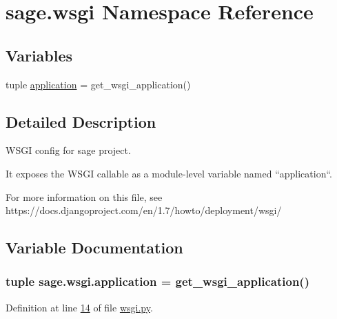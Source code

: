 \hypertarget{namespacesage_1_1wsgi}{}\section{sage.\+wsgi Namespace Reference}
\label{namespacesage_1_1wsgi}
\subsection*{Variables}
\begin{DoxyCompactItemize}
\item 
tuple \hyperlink{namespacesage_1_1wsgi_a1ddb23bace7377dbda42c61a804bb9aa}{application} = get\+\_\+wsgi\+\_\+application()
\end{DoxyCompactItemize}


\subsection{Detailed Description}
\begin{DoxyVerb}WSGI config for sage project.

It exposes the WSGI callable as a module-level variable named ``application``.

For more information on this file, see
https://docs.djangoproject.com/en/1.7/howto/deployment/wsgi/
\end{DoxyVerb}
 

\subsection{Variable Documentation}
\hypertarget{namespacesage_1_1wsgi_a1ddb23bace7377dbda42c61a804bb9aa}{}
\subsubsection[{application}]{\setlength{\rightskip}{0pt plus 5cm}tuple sage.\+wsgi.\+application = get\+\_\+wsgi\+\_\+application()}\label{namespacesage_1_1wsgi_a1ddb23bace7377dbda42c61a804bb9aa}


Definition at line \hyperlink{wsgi_8py_source_l00014}{14} of file \hyperlink{wsgi_8py_source}{wsgi.\+py}.

